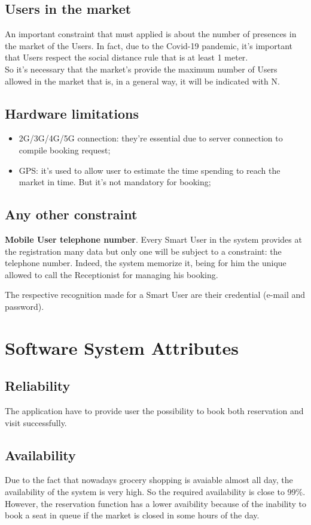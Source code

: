 \subsection{Users in the market}
An important constraint that must applied is about the number of presences in the market of the Users. In fact, due to the Covid-19 pandemic, it's important that Users respect the social distance rule that is at least 1 meter.\\
So it's necessary that the market's provide the maximum number of Users allowed in the market that is, in a general way, it will be indicated with N.
\par
\subsection{Hardware limitations}
\begin{itemize}
\item 2G/3G/4G/5G connection: they're essential due to server connection to compile booking request;
\item GPS: it's used to allow user to estimate the time spending to reach the market in time. But it's not mandatory for booking;
\end{itemize}
\subsection{Any other constraint}

\textbf{Mobile User telephone number}. Every Smart User in the system provides at the registration many data but only one will be subject to a constraint: the telephone number. Indeed, the system memorize it, being for him the unique allowed to call the Receptionist for managing his booking. \par
The respective recognition made for a Smart User are their credential (e-mail and password).


\bigskip
\par
\section{Software System Attributes}
\subsection{Reliability}
The application have to provide user the possibility to book both reservation and visit successfully. 
\subsection{Availability}
Due to the fact that nowadays grocery shopping is avaiable almost all day, the availability of the system is very high. So the required availability is close to 99\%. \\
However, the reservation function has a lower avaibility because of the inability to book a seat in queue if the market is closed in some hours of the day. 
